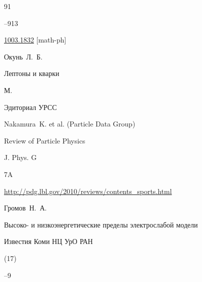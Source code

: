 \begin{thebibliography}{91}

--913


\arxiv \href{http://arxiv.org/abs/1003.1832}{1003.1832} [math-ph] 







\by Окунь~Л.~Б. 

\book Лептоны и кварки

\publaddr М.

\publ Эдиториал УРСС









\by Nakamura~K. et al. (Particle Data Group)

\paper  Review of Particle Physics

\jour J. Phys. G 


\issue 7A 




\elink \url{http://pdg.lbl.gov/2010/reviews/contents_sports.html}




\by Громов~Н.~А.

\paper Высоко- и низкоэнергетические пределы электрослабой модели


\jour Известия Коми НЦ УрО РАН


(17)

--9







\end{thebibliography}
